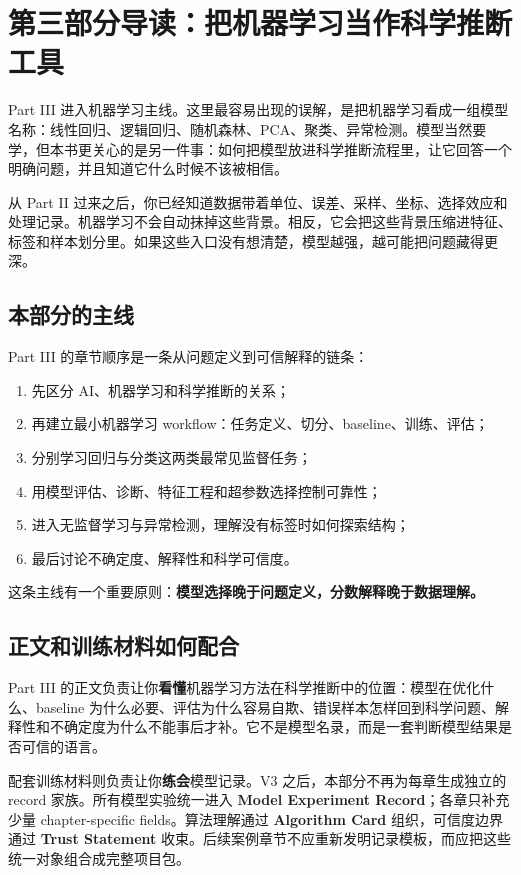 \chapter*{第三部分导读：把机器学习当作科学推断工具}

Part III 进入机器学习主线。这里最容易出现的误解，是把机器学习看成一组模型名称：线性回归、逻辑回归、随机森林、PCA、聚类、异常检测。模型当然要学，但本书更关心的是另一件事：如何把模型放进科学推断流程里，让它回答一个明确问题，并且知道它什么时候不该被相信。

从 Part II 过来之后，你已经知道数据带着单位、误差、采样、坐标、选择效应和处理记录。机器学习不会自动抹掉这些背景。相反，它会把这些背景压缩进特征、标签和样本划分里。如果这些入口没有想清楚，模型越强，越可能把问题藏得更深。

\section*{本部分的主线}

Part III 的章节顺序是一条从问题定义到可信解释的链条：

\begin{enumerate}
    \item 先区分 AI、机器学习和科学推断的关系；
    \item 再建立最小机器学习 workflow：任务定义、切分、baseline、训练、评估；
    \item 分别学习回归与分类这两类最常见监督任务；
    \item 用模型评估、诊断、特征工程和超参数选择控制可靠性；
    \item 进入无监督学习与异常检测，理解没有标签时如何探索结构；
    \item 最后讨论不确定度、解释性和科学可信度。
\end{enumerate}

这条主线有一个重要原则：\textbf{模型选择晚于问题定义，分数解释晚于数据理解。}

\section*{正文和训练材料如何配合}

Part III 的正文负责让你\textbf{看懂}机器学习方法在科学推断中的位置：模型在优化什么、baseline 为什么必要、评估为什么容易自欺、错误样本怎样回到科学问题、解释性和不确定度为什么不能事后才补。它不是模型名录，而是一套判断模型结果是否可信的语言。

配套训练材料则负责让你\textbf{练会}模型记录。V3 之后，本部分不再为每章生成独立的 record 家族。所有模型实验统一进入 \textbf{Model Experiment Record}；各章只补充少量 chapter-specific fields。算法理解通过 \textbf{Algorithm Card} 组织，可信度边界通过 \textbf{Trust Statement} 收束。后续案例章节不应重新发明记录模板，而应把这些统一对象组合成完整项目包。

